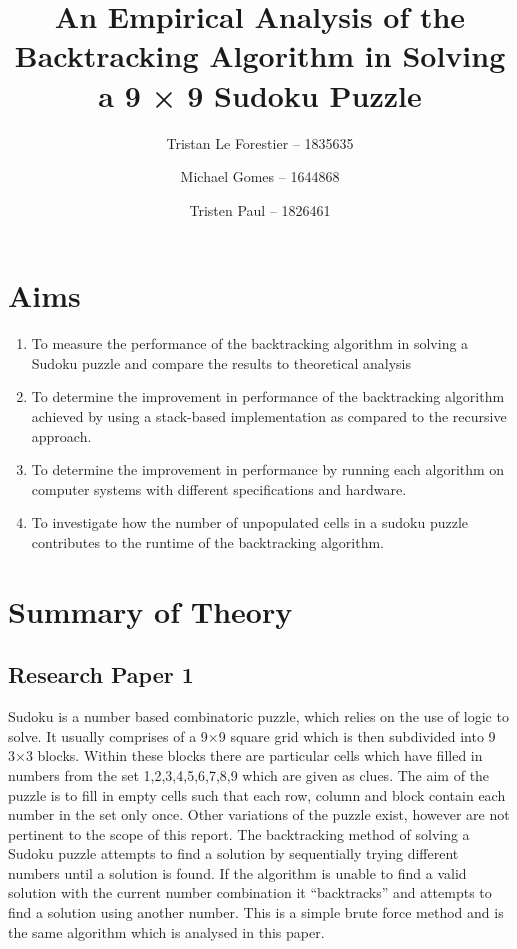 \documentclass[11pt]{article}
\begin{document}
\title{An Empirical Analysis of the Backtracking Algorithm in Solving a 9 × 9 Sudoku Puzzle}
\author{Tristan Le Forestier – 1835635 \and Michael Gomes – 1644868 \and Tristen Paul – 1826461}
\maketitle

\newpage

\section{Aims}
\begin{enumerate}
\item To measure the performance of the backtracking algorithm in solving a Sudoku puzzle and compare the results to theoretical analysis
\item To determine the improvement in performance of the backtracking algorithm achieved by using a stack-based implementation as compared to the recursive approach. 
\item To determine the improvement in performance by running each algorithm on computer systems with different specifications and hardware.
\item To investigate how the number of unpopulated cells in a sudoku puzzle contributes to the runtime of the backtracking algorithm.
\end{enumerate}

\section{Summary of Theory}
\subsection{Research Paper 1}Sudoku is a number based combinatoric puzzle, which relies on the use of logic to solve. 
It usually comprises of a 9×9 square grid which is then subdivided into 9 3×3 blocks. 
Within these blocks there are particular cells which have filled in numbers from the set {1,2,3,4,5,6,7,8,9} which are given as clues. 
The aim of the puzzle is to fill in empty cells such that each row, column and block contain each number in the set only once.
 \cite{DJVP}Other variations of the puzzle exist, however are not pertinent to the scope of this report.  
The backtracking method of solving a Sudoku puzzle attempts to find a solution by sequentially trying different numbers until a solution is found.
 If the algorithm is unable to find a valid solution with the current number combination it “backtracks” and attempts to find a solution using another number. 
 This is a simple brute force method and is the same algorithm which is analysed in this paper. \cite{DJVP}  
\end{document}
